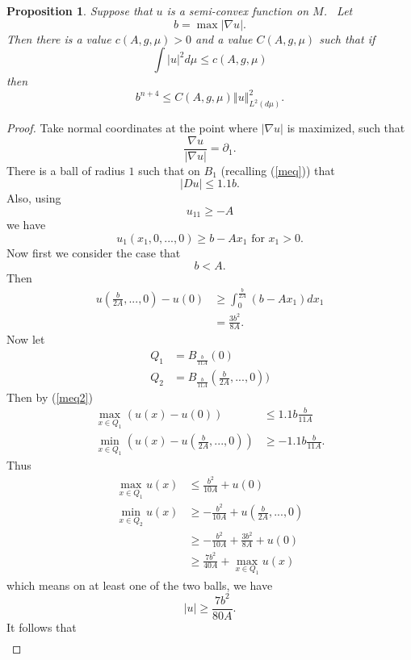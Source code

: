 \documentclass[11pt,letterpaper]{amsart}%
\newtheorem{proposition}[theorem]{Proposition}
\numberwithin{equation}{section}
\begin{document}
\begin{proposition}
\label{bbbb}Suppose that $u$ is a semi-convex function on $M$. \ Let
\[
b=\max\left\vert \nabla u\right\vert .
\]
Then there is a value $c(A,g,\mu)>0$ and a value $C(A,g,\mu)$ such that if
\[
\int\left\vert u\right\vert ^{2}d\mu\leq c(A,g,\mu)
\]
then
\[
b^{n+4}\leq C(A,g,\mu)\left\Vert u\right\Vert _{L^{2}(d\mu)}^{2}.
\]

\end{proposition}

\begin{proof}
Take normal coordinates at the point where $\left\vert \nabla u\right\vert $
is maximized, such that
\[
\frac{\nabla u}{\left\vert \nabla u\right\vert }=\partial_{1}.%
\]
There is a ball of radius $1$ such that on $B_{1}$ (recalling (\ref{meq})) that
\begin{equation}
\left\vert Du\right\vert \leq1.1b \label{meq2}.%
\end{equation}
Also, using
\[
u_{11}\geq-A
\]
we have
\[
u_{1}(x_{1},0,...,0)\geq b-Ax_{1}\text{ for }x_{1}>0.
\]
Now first we consider the case that
\[
b<A.
\]
Then
\begin{align*}
u(\frac{b}{2A},...,0)-u(0)  &  \geq\int_{0}^{\frac{b}{2A}}\left(
b-Ax_{1}\right)  dx_{1}\\
&  =\frac{3b^{2}}{8A}.
\end{align*}
Now let
\begin{align*}
Q_{1}  &  =B_{\frac{b}{11A}}(0)\\
Q_{2}  &  =B_{\frac{b}{11A}}(\frac{b}{2A},...,0))
\end{align*}
Then by (\ref{meq2})
\begin{align*}
\max_{x\in Q_{1}}\left(  u(x)-u(0)\right)   &  \leq1.1b\frac{b}{11A}\\
\min_{x\in Q_{1}}\left(  u(x)-u(\frac{b}{2A},...,0)\right)   &  \geq
-1.1b\frac{b}{11A}.%
\end{align*}
Thus
\begin{align*}
\max_{x\in Q_{1}}u(x)  &  \leq\frac{b^{2}}{10A}+u(0)\\
\min_{x\in Q_{2}}u(x)  &  \geq-\frac{b^{2}}{10A}+u(\frac{b}{2A},...,0)\\
&  \geq-\frac{b^{2}}{10A}+\frac{3b^{2}}{8A}+u(0)\\
&  \geq\frac{7b^{2}}{40A}+\max_{x\in Q_{1}}u(x)
\end{align*}
which means on at least one of the two balls, we have
\[
\left\vert u\right\vert \geq\frac{7b^{2}}{80A}.
\]
It follows that
\begin{align*}

\end{align*}
\end{proof}
\end{document}
